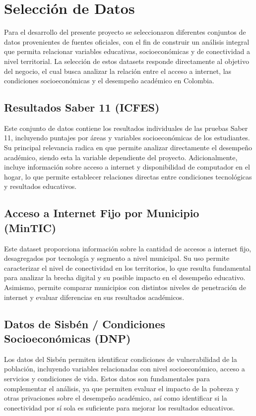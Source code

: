 \section{Selección de Datos}
Para el desarrollo del presente proyecto se seleccionaron diferentes conjuntos de datos provenientes de fuentes oficiales, con el fin de construir un análisis integral que permita relacionar variables educativas, socioeconómicas y de conectividad a nivel territorial.
La selección de estos datasets responde directamente al objetivo del negocio, el cual busca analizar la relación entre el acceso a internet, las condiciones socioeconómicas y el desempeño académico en Colombia.
\subsection{Resultados Saber 11 (ICFES)}
Este conjunto de datos contiene los resultados individuales de las pruebas Saber 11, incluyendo puntajes por áreas y variables socioeconómicas de los estudiantes.
Su principal relevancia radica en que permite analizar directamente el desempeño académico, siendo esta la variable dependiente del proyecto. Adicionalmente, incluye información sobre acceso a internet y disponibilidad de computador en el hogar, lo que permite establecer relaciones directas entre condiciones tecnológicas y resultados educativos.
\subsection{Acceso a Internet Fijo por Municipio (MinTIC)}
Este dataset proporciona información sobre la cantidad de accesos a internet fijo, desagregados por tecnología y segmento a nivel municipal.
Su uso permite caracterizar el nivel de conectividad en los territorios, lo que resulta fundamental para analizar la brecha digital y su posible impacto en el desempeño educativo. Asimismo, permite comparar municipios con distintos niveles de penetración de internet y evaluar diferencias en sus resultados académicos.
\subsection{Datos de Sisbén / Condiciones Socioeconómicas (DNP)}
Los datos del Sisbén permiten identificar condiciones de vulnerabilidad de la población, incluyendo variables relacionadas con nivel socioeconómico, acceso a servicios y condiciones de vida.
Estos datos son fundamentales para complementar el análisis, ya que permiten evaluar el impacto de la pobreza y otras privaciones sobre el desempeño académico, así como identificar si la conectividad por sí sola es suficiente para mejorar los resultados educativos.
